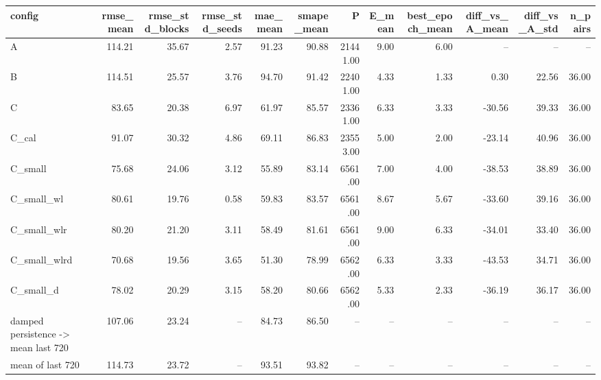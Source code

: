 \begin{tabular}{lrrrrrrrrrrr}
\toprule
config & rmse\_mean & rmse\_std\_blocks & rmse\_std\_seeds & mae\_mean & smape\_mean & P & E\_mean & best\_epoch\_mean & diff\_vs\_A\_mean & diff\_vs\_A\_std & n\_pairs \\
\midrule
A & 114.21 & 35.67 & 2.57 & 91.23 & 90.88 & 21441.00 & 9.00 & 6.00 & -- & -- & -- \\
B & 114.51 & 25.57 & 3.76 & 94.70 & 91.42 & 22401.00 & 4.33 & 1.33 & 0.30 & 22.56 & 36.00 \\
C & 83.65 & 20.38 & 6.97 & 61.97 & 85.57 & 23361.00 & 6.33 & 3.33 & -30.56 & 39.33 & 36.00 \\
C\_cal & 91.07 & 30.32 & 4.86 & 69.11 & 86.83 & 23553.00 & 5.00 & 2.00 & -23.14 & 40.96 & 36.00 \\
C\_small & 75.68 & 24.06 & 3.12 & 55.89 & 83.14 & 6561.00 & 7.00 & 4.00 & -38.53 & 38.89 & 36.00 \\
C\_small\_wl & 80.61 & 19.76 & 0.58 & 59.83 & 83.57 & 6561.00 & 8.67 & 5.67 & -33.60 & 39.16 & 36.00 \\
C\_small\_wlr & 80.20 & 21.20 & 3.11 & 58.49 & 81.61 & 6561.00 & 9.00 & 6.33 & -34.01 & 33.40 & 36.00 \\
C\_small\_wlrd & 70.68 & 19.56 & 3.65 & 51.30 & 78.99 & 6562.00 & 6.33 & 3.33 & -43.53 & 34.71 & 36.00 \\
C\_small\_d & 78.02 & 20.29 & 3.15 & 58.20 & 80.66 & 6562.00 & 5.33 & 2.33 & -36.19 & 36.17 & 36.00 \\
[baseline] damped persistence -> mean last 720 & 107.06 & 23.24 & -- & 84.73 & 86.50 & -- & -- & -- & -- & -- & -- \\
[baseline] mean of last 720 & 114.73 & 23.72 & -- & 93.51 & 93.82 & -- & -- & -- & -- & -- & -- \\
\bottomrule
\end{tabular}
